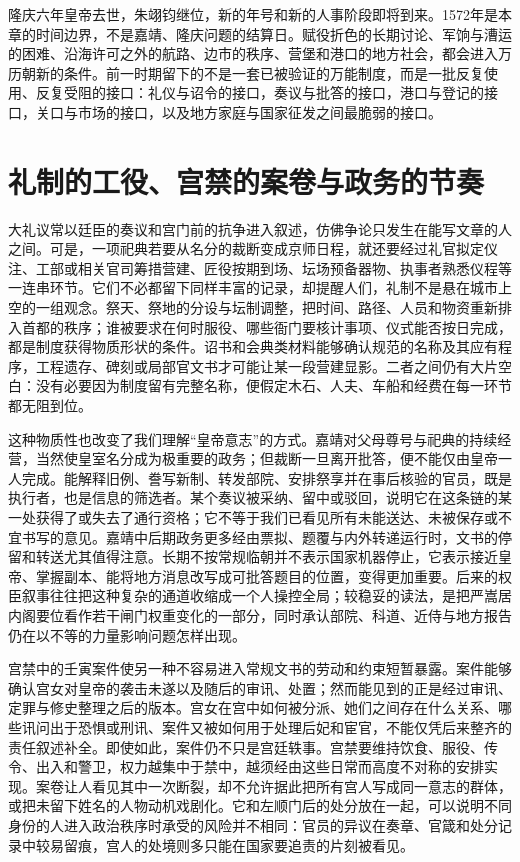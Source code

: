 隆庆六年皇帝去世，朱翊钧继位，新的年号和新的人事阶段即将到来。1572年是本章的时间边界，不是嘉靖、隆庆问题的结算日。赋役折色的长期讨论、军饷与漕运的困难、沿海许可之外的航路、边市的秩序、营堡和港口的地方社会，都会进入万历朝新的条件。前一时期留下的不是一套已被验证的万能制度，而是一批反复使用、反复受阻的接口：礼仪与诏令的接口，奏议与批答的接口，港口与登记的接口，关口与市场的接口，以及地方家庭与国家征发之间最脆弱的接口。

\section{礼制的工役、宫禁的案卷与政务的节奏}

大礼议常以廷臣的奏议和宫门前的抗争进入叙述，仿佛争论只发生在能写文章的人之间。可是，一项祀典若要从名分的裁断变成京师日程，就还要经过礼官拟定仪注、工部或相关官司筹措营建、匠役按期到场、坛场预备器物、执事者熟悉仪程等一连串环节。它们不必都留下同样丰富的记录，却提醒人们，礼制不是悬在城市上空的一组观念。祭天、祭地的分设与坛制调整，把时间、路径、人员和物资重新排入首都的秩序；谁被要求在何时服役、哪些衙门要核计事项、仪式能否按日完成，都是制度获得物质形状的条件。诏书和会典类材料能够确认规范的名称及其应有程序，工程遗存、碑刻或局部官文书才可能让某一段营建显影。二者之间仍有大片空白：没有必要因为制度留有完整名称，便假定木石、人夫、车船和经费在每一环节都无阻到位。

这种物质性也改变了我们理解“皇帝意志”的方式。嘉靖对父母尊号与祀典的持续经营，当然使皇室名分成为极重要的政务；但裁断一旦离开批答，便不能仅由皇帝一人完成。能解释旧例、誊写新制、转发部院、安排祭享并在事后核验的官员，既是执行者，也是信息的筛选者。某个奏议被采纳、留中或驳回，说明它在这条链的某一处获得了或失去了通行资格；它不等于我们已看见所有未能送达、未被保存或不宜书写的意见。嘉靖中后期政务更多经由票拟、题覆与内外转递运行时，文书的停留和转送尤其值得注意。长期不按常规临朝并不表示国家机器停止，它表示接近皇帝、掌握副本、能将地方消息改写成可批答题目的位置，变得更加重要。后来的权臣叙事往往把这种复杂的通道收缩成一个人操控全局；较稳妥的读法，是把严嵩居内阁要位看作若干闸门权重变化的一部分，同时承认部院、科道、近侍与地方报告仍在以不等的力量影响问题怎样出现。

宫禁中的壬寅案件使另一种不容易进入常规文书的劳动和约束短暂暴露。案件能够确认宫女对皇帝的袭击未遂以及随后的审讯、处置；然而能见到的正是经过审讯、定罪与修史整理之后的版本。宫女在宫中如何被分派、她们之间存在什么关系、哪些讯问出于恐惧或刑讯、案件又被如何用于处理后妃和宦官，不能仅凭后来整齐的责任叙述补全。即使如此，案件仍不只是宫廷轶事。宫禁要维持饮食、服役、传令、出入和警卫，权力越集中于禁中，越须经由这些日常而高度不对称的安排实现。案卷让人看见其中一次断裂，却不允许据此把所有宫人写成同一意志的群体，或把未留下姓名的人物动机戏剧化。它和左顺门后的处分放在一起，可以说明不同身份的人进入政治秩序时承受的风险并不相同：官员的异议在奏章、官箴和处分记录中较易留痕，宫人的处境则多只能在国家要追责的片刻被看见。

